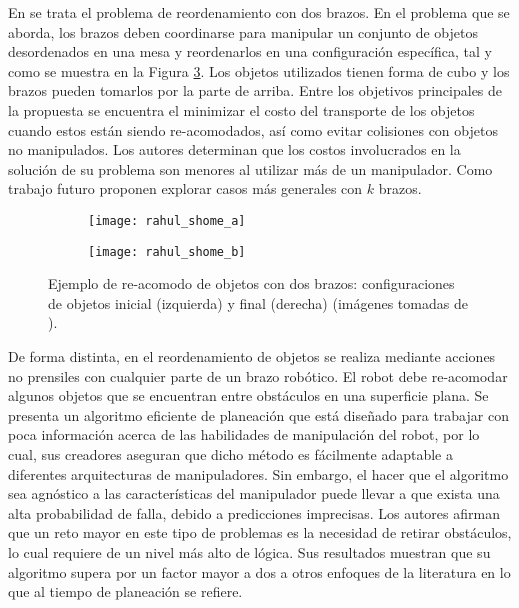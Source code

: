 En \cite{10.1007/978-3-030-44051-0_45} se trata el problema de reordenamiento con dos brazos.
En el problema que se aborda, los brazos deben coordinarse para manipular un conjunto de objetos desordenados en una mesa y reordenarlos en una configuración específica, tal y como se muestra en la Figura \ref{fig:10.1007/978-3-030-44051-0_45}.
Los objetos utilizados tienen forma de cubo y los brazos pueden tomarlos por la parte de arriba.
Entre los objetivos principales de la propuesta se encuentra el minimizar el costo del transporte de los objetos cuando estos están siendo re-acomodados, así como evitar colisiones con objetos no manipulados. 
Los autores determinan que los costos involucrados en la solución de su problema son menores al utilizar más de un manipulador. 
Como trabajo futuro proponen explorar casos más generales con $k$ brazos.
%
\begin{figure}[H]
	\begin{subfigure}{0.35\linewidth}
		\texttt{[image: rahul\_shome\_a]}%
		\label{subfig:initial_conf}%
	\end{subfigure}%
	\hspace{1cm}%
	\begin{subfigure}{0.35\linewidth}
		\texttt{[image: rahul\_shome\_b]}%
		\label{subfig:final_conf}%
	\end{subfigure}%
	\caption{Ejemplo de re-acomodo de objetos con dos brazos: configuraciones de objetos inicial (izquierda) y final (derecha) (imágenes tomadas de \cite{10.1007/978-3-030-44051-0_45}).}%
	\label{fig:10.1007/978-3-030-44051-0_45}%
\end{figure}
%
De forma distinta, en \cite{2019arXiv190103557H} el reordenamiento de objetos se realiza mediante acciones no prensiles con cualquier parte de un brazo robótico.
El robot debe re-acomodar algunos objetos que se encuentran entre obstáculos en una superficie plana.
Se presenta un algoritmo eficiente de planeación que está diseñado para trabajar con poca información acerca de las habilidades de manipulación del robot, por lo cual, sus creadores aseguran que dicho método es fácilmente adaptable a diferentes arquitecturas de manipuladores.
Sin embargo, el hacer que el algoritmo sea agnóstico a las características del manipulador puede llevar a que exista una alta probabilidad de falla, debido a predicciones imprecisas.
Los autores afirman que un reto mayor en este tipo de problemas es la necesidad de retirar obstáculos, lo cual requiere de un nivel más alto de lógica. 
Sus resultados muestran que su algoritmo supera por un factor mayor a dos a otros enfoques de la literatura en lo que al tiempo de planeación se refiere.

